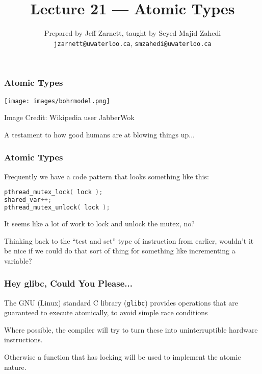 

\title{Lecture 21 --- Atomic Types }

\author{Prepared by Jeff Zarnett, taught by Seyed Majid Zahedi \\ \small \texttt{jzarnett@uwaterloo.ca}, \texttt{smzahedi@uwaterloo.ca}}
\date{}




\begin{frame}
	\titlepage

\end{frame}

\begin{frame}
	\frametitle{Atomic Types}
	\begin{center}
		\texttt{[image: images/bohrmodel.png]}
	\end{center}
	\hfill Image Credit: Wikipedia user JabberWok

	A testament to how good humans are at blowing things up...

\end{frame}



\begin{frame}[fragile]
	\frametitle{Atomic Types}

	Frequently we have a code pattern that looks something like this:

	\begin{lstlisting}[language=C]
pthread_mutex_lock( lock );
shared_var++;
pthread_mutex_unlock( lock );
\end{lstlisting}

	It seems like a lot of work to lock and unlock the mutex, no?

	Thinking back to the ``test and set'' type of instruction from earlier, wouldn't it be nice if we could do that sort of thing for something like incrementing a variable?

\end{frame}

\begin{frame}
	\frametitle{Hey glibc, Could You Please...}

The GNU (Linux) standard C library (\texttt{glibc}) provides operations that are guaranteed to execute atomically, to avoid simple race conditions

	Where possible, the compiler will try to turn these into uninterruptible hardware instructions.
	
	Otherwise a function that has locking will be used to implement the atomic nature.
\end{frame}

